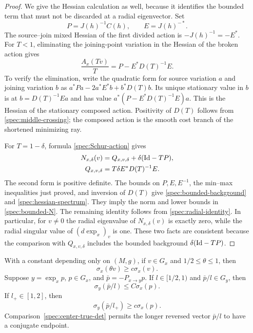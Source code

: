 \begin{proof}
We give the Hessian calculation as well, because it identifies the
bounded term that must not be discarded at a radial eigenvector.
Set
\[
  P=J(h)^{-1}C(h),\qquad E=J(h)^{-*}.
\]
The source--join mixed Hessian of the first divided action is
$-J(h)^{-1}=-E^*$.  For $T<1$, eliminating the joining-point
variation in the Hessian of the broken action gives
\begin{equation}\label{spec:Schur-action}
  \frac{A_x(Tv)}{T}=P-E^*D(T)^{-1}E.
\end{equation}
To verify the elimination, write the quadratic form for source
variation $a$ and joining variation $b$ as
$a^*Pa-2a^*E^*b+b^*D(T)b$.  Its unique stationary value in $b$ is
at $b=D(T)^{-1}Ea$ and has value
$a^*(P-E^*D(T)^{-1}E)a$.  This is the Hessian of the stationary
composed action.  Positivity of $D(T)$ follows from
\eqref{spec:middle-crossing}; the composed action is the smooth
cost branch of the shortened minimizing ray.

For $T=1-\delta$, formula \eqref{spec:Schur-action} gives
\begin{equation}\label{spec:Q-definition}
\begin{split}
  N_{x,\delta}(v)&=Q_{x,v,\delta}
                         +\delta(\mathrm{Id}-TP),\\
  Q_{x,v,\delta}&=T\delta E^*D(T)^{-1}E.
\end{split}
\end{equation}
The second form is positive definite.  The bounds on $P,E,E^{-1}$,
the min--max inequalities just proved, and inversion of $D(T)$ give
\eqref{spec:bounded-background} and \eqref{spec:hessian-spectrum}.
They imply the norm and lower bounds in \eqref{spec:bounded-N}.
The remaining identity follows from
\eqref{spec:radial-identity}.  In particular, for $v\ne0$ the radial
eigenvalue of $N_{x,\delta}(v)$ is exactly zero, while the radial
singular value of $(d\exp_x)_v$ is one.  These two facts are consistent
because the comparison with $Q_{x,v,\delta}$ includes the bounded
background $\delta(\mathrm{Id}-TP)$.
\end{proof}

\begin{corollary}
\label{spec:radial-determinants}
With a constant depending only on $(M,g)$, if $v\in G_x$ and
$1/2\le\theta\le1$, then
\begin{equation}\label{spec:radial-det}
  \sigma_x(\theta v)\ge c\sigma_x(v).
\end{equation}
Suppose $y=\exp_xp$, $p\in G_x$, and
$\bar p=-P_{x\to y}p$.  If $l\in[1/2,1)$ and $\bar p/l\in G_y$,
then
\begin{equation}\label{spec:center-true-det}
  \sigma_y(\bar p/l)\le C\sigma_x(p).
\end{equation}
If $l_+\in[1,2]$, then
\begin{equation}\label{spec:outer-true-det}
  \sigma_y(\bar p/l_+)\ge c\sigma_x(p).
\end{equation}
Comparison~\eqref{spec:center-true-det} permits the longer reversed
vector $\bar p/l$ to have a conjugate endpoint.
\end{corollary}

